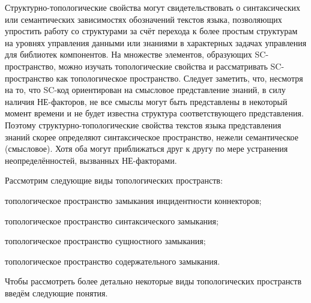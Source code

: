 Структурно-топологические свойства могут свидетельствовать о синтаксических или семантических зависимостях обозначений текстов языка, позволяющих упростить работу со структурами за счёт перехода к более простым структурам на уровнях управления данными или знаниями в характерных задачах управления для библиотек компонентов.
На множестве элементов, образующих SC-пространство, можно изучать топологические свойства и рассматривать SC-пространство как топологическое пространство. Следует заметить, что, несмотря на то, что SC-код ориентирован на смысловое представление знаний, в силу наличия НЕ-факторов, не все смыслы могут быть представлены в некоторый момент времени и не будет известна структура соответствующего представления. Поэтому структурно-топологические свойства текстов языка представления знаний скорее определяют синтаксическое пространство, нежели семантическое (смысловое). Хотя оба могут приближаться друг к другу по мере устранения неопределённостей, вызванных НЕ-факторами.

Рассмотрим следующие виды топологических пространств:
\begin{textitemize}
	\item топологическое пространство замыкания инцидентности коннекторов;
	\item топологическое пространство синтаксического замыкания;
	\item топологическое пространство сущностного замыкания;
	\item топологическое пространство содержательного замыкания.
\end{textitemize}

\begin{SCn}
\end{SCn}

Чтобы рассмотреть более детально некоторые виды топологических пространств введём следующие понятия.

\begin{SCn}
\end{SCn}

